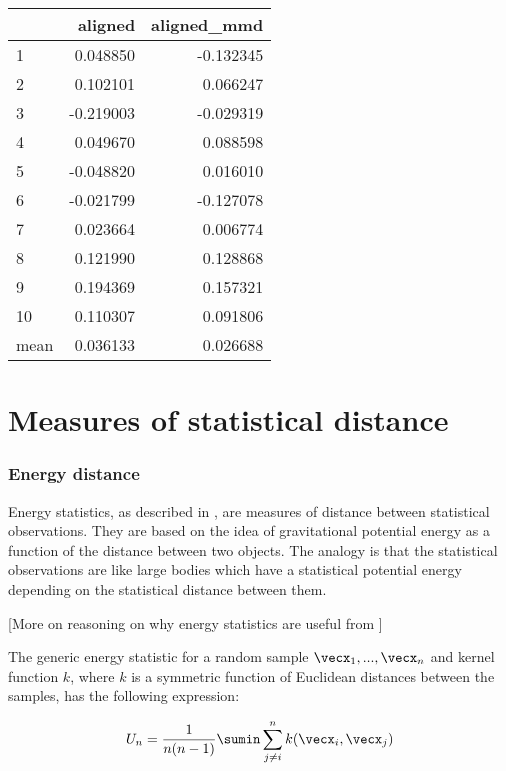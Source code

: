 \begin{tabular}{lrr}
\toprule
{} &   aligned &  aligned\_mmd \\
\midrule
1    &  0.048850 &    -0.132345 \\
2    &  0.102101 &     0.066247 \\
3    & -0.219003 &    -0.029319 \\
4    &  0.049670 &     0.088598 \\
5    & -0.048820 &     0.016010 \\
6    & -0.021799 &    -0.127078 \\
7    &  0.023664 &     0.006774 \\
8    &  0.121990 &     0.128868 \\
9    &  0.194369 &     0.157321 \\
10   &  0.110307 &     0.091806 \\
\midrule
mean &  0.036133 &     0.026688 \\
\bottomrule
\end{tabular}
    
\section{Measures of statistical distance}

\subsubsection{Energy distance}

Energy statistics, as described in \cite{energystatistics}, are measures of distance between statistical observations. They are based on the idea of gravitational potential energy as a function of the distance between two objects. The analogy is that the statistical observations are like large bodies which have a statistical potential energy depending on the statistical distance between them. 

[More on reasoning on why energy statistics are useful from \cite{energystatistics}]

The generic energy statistic for a random sample $\vecx_1, ..., \vecx_n$ and kernel function $k$, where $k$ is a symmetric function of Euclidean distances between the samples, has the following expression:

\begin{equation}
\label{eq:energystatistic}
\begin{split}
U_n = \frac{1}{n(n-1)} \sumin \sum_{j \neq i}^n k(\vecx_i, \vecx_j)
\end{split}
\end{equation}

